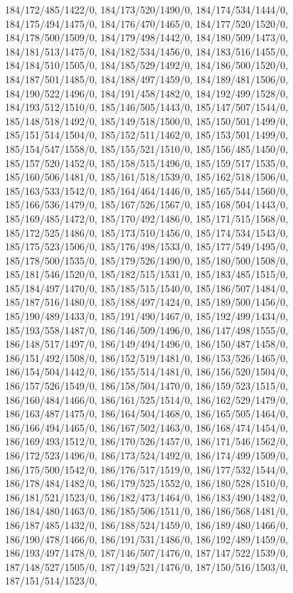 {184/172/485/1422/0,%
184/173/520/1490/0,%
184/174/534/1444/0,%
184/175/494/1475/0,%
184/176/470/1465/0,%
184/177/520/1520/0,%
184/178/500/1509/0,%
184/179/498/1442/0,%
184/180/509/1473/0,%
184/181/513/1475/0,%
184/182/534/1456/0,%
184/183/516/1455/0,%
184/184/510/1505/0,%
184/185/529/1492/0,%
184/186/500/1520/0,%
184/187/501/1485/0,%
184/188/497/1459/0,%
184/189/481/1506/0,%
184/190/522/1496/0,%
184/191/458/1482/0,%
184/192/499/1528/0,%
184/193/512/1510/0,%
185/146/505/1443/0,%
185/147/507/1544/0,%
185/148/518/1492/0,%
185/149/518/1500/0,%
185/150/501/1499/0,%
185/151/514/1504/0,%
185/152/511/1462/0,%
185/153/501/1499/0,%
185/154/547/1558/0,%
185/155/521/1510/0,%
185/156/485/1450/0,%
185/157/520/1452/0,%
185/158/515/1496/0,%
185/159/517/1535/0,%
185/160/506/1481/0,%
185/161/518/1539/0,%
185/162/518/1506/0,%
185/163/533/1542/0,%
185/164/464/1446/0,%
185/165/544/1560/0,%
185/166/536/1479/0,%
185/167/526/1567/0,%
185/168/504/1443/0,%
185/169/485/1472/0,%
185/170/492/1486/0,%
185/171/515/1568/0,%
185/172/525/1486/0,%
185/173/510/1456/0,%
185/174/534/1543/0,%
185/175/523/1506/0,%
185/176/498/1533/0,%
185/177/549/1495/0,%
185/178/500/1535/0,%
185/179/526/1490/0,%
185/180/500/1508/0,%
185/181/546/1520/0,%
185/182/515/1531/0,%
185/183/485/1515/0,%
185/184/497/1470/0,%
185/185/515/1540/0,%
185/186/507/1484/0,%
185/187/516/1480/0,%
185/188/497/1424/0,%
185/189/500/1456/0,%
185/190/489/1433/0,%
185/191/490/1467/0,%
185/192/499/1434/0,%
185/193/558/1487/0,%
186/146/509/1496/0,%
186/147/498/1555/0,%
186/148/517/1497/0,%
186/149/494/1496/0,%
186/150/487/1458/0,%
186/151/492/1508/0,%
186/152/519/1481/0,%
186/153/526/1465/0,%
186/154/504/1442/0,%
186/155/514/1481/0,%
186/156/520/1504/0,%
186/157/526/1549/0,%
186/158/504/1470/0,%
186/159/523/1515/0,%
186/160/484/1466/0,%
186/161/525/1514/0,%
186/162/529/1479/0,%
186/163/487/1475/0,%
186/164/504/1468/0,%
186/165/505/1464/0,%
186/166/494/1465/0,%
186/167/502/1463/0,%
186/168/474/1454/0,%
186/169/493/1512/0,%
186/170/526/1457/0,%
186/171/546/1562/0,%
186/172/523/1496/0,%
186/173/524/1492/0,%
186/174/499/1509/0,%
186/175/500/1542/0,%
186/176/517/1519/0,%
186/177/532/1544/0,%
186/178/484/1482/0,%
186/179/525/1552/0,%
186/180/528/1510/0,%
186/181/521/1523/0,%
186/182/473/1464/0,%
186/183/490/1482/0,%
186/184/480/1463/0,%
186/185/506/1511/0,%
186/186/568/1481/0,%
186/187/485/1432/0,%
186/188/524/1459/0,%
186/189/480/1466/0,%
186/190/478/1466/0,%
186/191/531/1486/0,%
186/192/489/1459/0,%
186/193/497/1478/0,%
187/146/507/1476/0,%
187/147/522/1539/0,%
187/148/527/1505/0,%
187/149/521/1476/0,%
187/150/516/1503/0,%
187/151/514/1523/0,%
}
